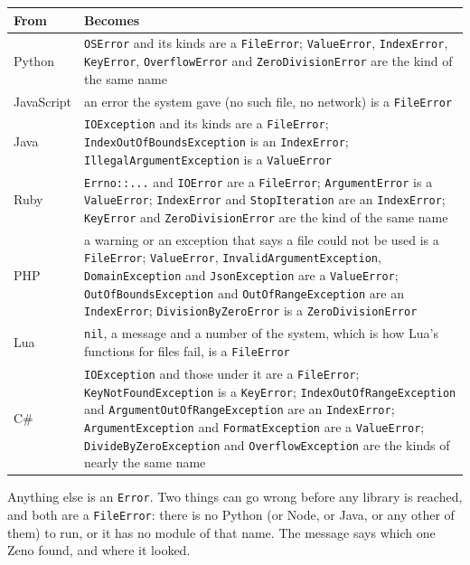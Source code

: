 \begin{center}
\begin{tabular}{lP{8.4cm}}
\toprule
From & Becomes \\
\midrule
Python & \verb|OSError| and its kinds are a \verb|FileError|;
  \verb|ValueError|, \verb|IndexError|, \verb|KeyError|,
  \verb|OverflowError| and \texttt{Zero\-Division\-Error} are the kind
  of the same name \\
JavaScript & an error the system gave (no such file, no network) is a
  \verb|FileError| \\
Java & \verb|IOException| and its kinds are a \verb|FileError|;
  \texttt{Index\-OutOf\-Bounds\-Exception} is an \verb|IndexError|;
  \texttt{Illegal\-Argument\-Exception} is a \verb|ValueError| \\
Ruby & \verb|Errno::...| and \verb|IOError| are a \verb|FileError|;
  \verb|ArgumentError| is a \verb|ValueError|; \verb|IndexError| and
  \verb|StopIteration| are an \verb|IndexError|; \verb|KeyError| and
  \texttt{Zero\-Division\-Error} are the kind of the same name \\
PHP & a warning or an exception that says a file could not be used is
  a \verb|FileError|; \verb|ValueError|,
  \texttt{Invalid\-Argument\-Exception}, \verb|DomainException| and
  \verb|JsonException| are a \verb|ValueError|;
  \texttt{OutOf\-Bounds\-Exception} and \texttt{OutOf\-Range\-Exception}
  are an \verb|IndexError|; \texttt{Division\-ByZero\-Error} is a
  \texttt{Zero\-Division\-Error} \\
Lua & \verb|nil|, a message and a number of the system, which is how
  Lua's functions for files fail, is a \verb|FileError| \\
C\# & \verb|IOException| and those under it are a \verb|FileError|;
  \texttt{KeyNot\-Found\-Exception} is a \verb|KeyError|;
  \texttt{IndexOutOf\-Range\-Exception} and
  \texttt{ArgumentOutOf\-Range\-Exception} are an \verb|IndexError|;
  \verb|ArgumentException| and \verb|FormatException| are a
  \verb|ValueError|; \texttt{DivideBy\-Zero\-Exception} and
  \verb|OverflowException| are the kinds of nearly the same name \\
\bottomrule
\end{tabular}
\end{center}

\noindent Anything else is an \verb|Error|. Two things can go wrong
before any library is reached, and both are a \verb|FileError|: there
is no Python (or Node, or Java, or any other of them) to run, or it
has no module of that name. The message says which one Zeno found, and where it looked.

